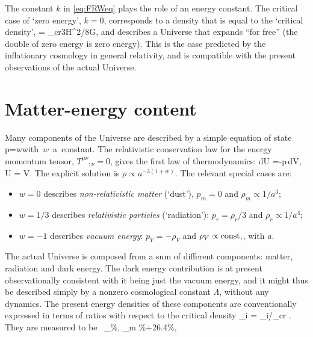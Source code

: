 The constant $k$ in \eqref{eq:FRWeq} plays the role of an energy constant. The critical case of `zero energy',  $k=0$,
corresponds to a density that is equal to the `critical density',
\beq 
\label{eq:rhocrit}
\rho =  \rho_{\rm cr}\equiv 3H^2/8\pi G, 
\eeq
and describes a Universe that expands ``for free'' (the double of zero energy is zero energy).
This is the case predicted by the inflationary cosmology in general relativity, and is compatible with the present observations of the actual Universe.

\medskip


\section{Matter-energy content}\label{app:matterenergy}

Many components of the Universe are described by a simple equation of state 
\beq  \label{eq:p=wrho}
p=w\rho\qquad\hbox{with $w$ a constant.}
\eeq
The relativistic conservation law for the energy momentum tensor, $T^{\mu\nu}{}_{;\nu}=0$,
 gives the first law of thermodynamics:
\beq dU =-p\,dV,
\qquad 
U = \rho V.
\eeq
The explicit solution is $\rho \propto a^{-3(1+w)}$.
The relevant special cases are:
\begin{itemize}

\item $w=0$ describes {\em non-relativistic matter} (`dust'), $p_m=0$ and $\rho_m \propto 1/a^3$;

\item $w=1/3$ describes {\em relativistic particles} (`radiation'): $p_r=\rho_r/3$ and $\rho_r \propto 1/a^4$;

\item $w=-1$ describes {\em vacuum energy}: $p_V=-\rho_V$ and $\rho_V \propto {\rm const,}$, with $a$.

\end{itemize}
The actual Universe is composed from a sum of different components: matter, radiation and dark energy. The dark energy contribution is at present observationally consistent with it being just  the vacuum energy, and it might thus be described simply by a nonzero cosmological constant $\Lambda$, without any dynamics. 
The present energy densities of these components are conventionally expressed in terms of ratios with respect to the critical density
\beq
\label{eq:Omegai}
 \Omega_i = \rho_i/\rho_{\rm cr} .
 \eeq
They are measured to be~\cite{PDG,Planckresults} 
\beq
\label{eq:Omegas}
 \Omega_\Lambda {}\%,\qquad
 \Omega_m \%+26.4\%,\qquad
